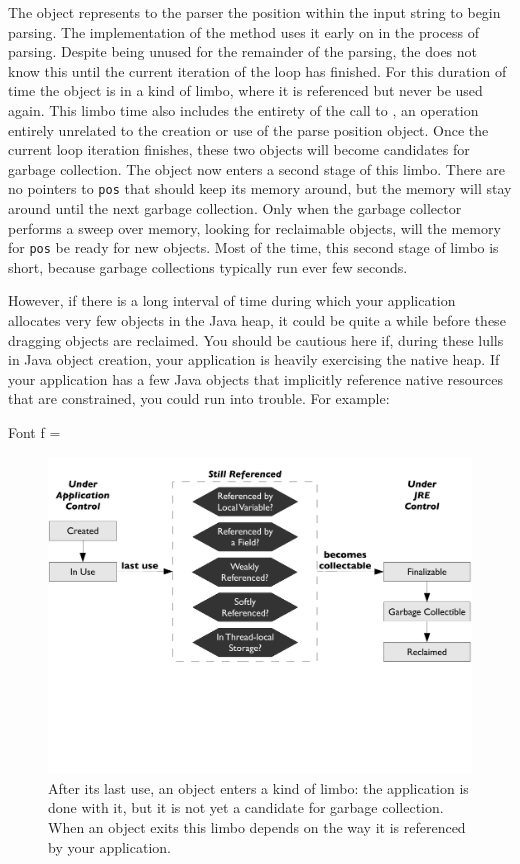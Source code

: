 The  object represents to the parser the position within the input
string to begin parsing. The implementation of the  method uses it
early on in the process of parsing. Despite being unused for the remainder of the
parsing, the \jre does not know this until the current iteration of the loop has
finished. For this duration of time the object is in a kind of limbo, where it is
referenced but never be used again. This limbo time also includes the entirety of
the call to , an operation entirely unrelated to the
creation or use of the parse position object. Once the current loop iteration
finishes, these two objects will become candidates for garbage collection.
The object now enters a second stage of this limbo. There are no pointers to
{\tt pos} that should keep its memory around, but the memory will stay around
until the next garbage collection.
Only when the garbage collector performs a sweep over memory, looking
for reclaimable objects, will the memory for {\tt pos} be ready for new objects.
Most of the time, this second stage of limbo is short, because garbage
collections typically run ever few seconds.

However, if there is a long interval
of time during which your application allocates very few objects in the Java
heap, it could be quite a while before these dragging objects are reclaimed. You
should be cautious here if, during these lulls in Java object creation, your
application is heavily exercising the native heap. If your application has a few
Java objects that implicitly reference native resources that are constrained,
you could run into trouble. For example:
\begin{shortlisting}
Font f = 
\end{shortlisting}

\begin{figure}
	\centering
	\includegraphics[width=\textwidth]{part2/Figures/lifetime/states}
	\caption{After its last use, an object enters a kind of limbo: the application
	is done with it, but it is not yet a candidate for garbage collection. When an
	object exits this limbo depends on the way it is referenced by your
	application.}
		\label{fig:limbo-exit}
\end{figure}

